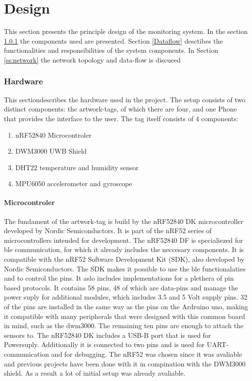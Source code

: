 \chapter{Design}

This section presents the principle design of the monitoring system.
In the section \ref{ss:hardware} the components used are presented.
Section \ref{Dataflow} desctibes the functionalities and responsibilities of the system components.
In Section \ref{ss:network} the network topology and data-flow is discueed

\subsection{Hardware}
\label{ss:hardware}

This sectiondescribes the hardware used in the project. The setup consists of two distinct components: the artwork-tags, of which there are four, and one Phone that provides the interface to the user. The tag itself consists of 4 components:
\begin{enumerate}
    \item nRF52840 Microcontroler
    \item DWM3000 UWB Shield
    \item DHT22 temperature and humidity sensor
    \item MPU6050 accelerometer and gyroscope
\end{enumerate}

\subsubsection{Microcontroler}
The fundament of the artwork-tag is build by the nRF52840 DK microcontroller developed by Nordic Semiconductors. 
It is part of the nRF52 series of microcontrollers intended for development.
The nRF52840 DF is specialiezed for ble communication, for which it already includes the neccesary components.
It is compatible with the nRF52 Software Development Kit (SDK), also developed by Nordic Semiconductors.
The SDK makes it possible to use the ble functionalaties and to control the pins. It aslo includes implementations for a plethera of pin based protocols.
It contains 58 pins, 48 of which are data-pins and manage the power suply for additional modules, which includes 3.5 and 5 Volt supply pins.
32 of the pins are installed in the same way as the pins on the Ardruino uno, making it compatible with many peripherals that were designed with this common board in mind, such as the dwm3000.
The remaining ten pins are enough to attach the sensors to.
The nRF52840 DK includes a USB-B port that is used for Powersuply. Additionally it is connected to two pins and is used for UART-communication and for debugging.
The nRF52 was chosen since it was avaliable and previous projects have been done with it in compination with the DWM3000 shield.
As a result a lot of initial setup was already avaliable.

